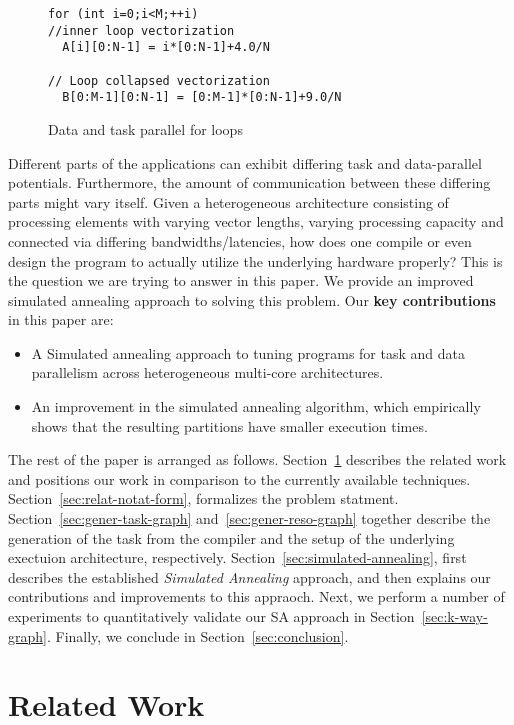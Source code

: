 \documentclass[10pt, conference, compsocconf]{IEEEtran}
\begin{document}
\begin{figure}[h!]
  \centering
  \small{
\begin{verbatim}
for (int i=0;i<M;++i)
//inner loop vectorization
  A[i][0:N-1] = i*[0:N-1]+4.0/N

// Loop collapsed vectorization
  B[0:M-1][0:N-1] = [0:M-1]*[0:N-1]+9.0/N
\end{verbatim}
  }
  \caption{Data and task parallel for loops}
  \label{fig:3}
\end{figure}

Different parts of the applications can exhibit differing task and
data-parallel potentials. Furthermore, the amount of communication
between these differing parts might vary itself. Given a heterogeneous
architecture consisting of processing elements with varying vector
lengths, varying processing capacity and connected via differing
bandwidths/latencies, how does one compile or even design the program to
actually utilize the underlying hardware properly? This is the question
we are trying to answer in this paper. We provide an improved simulated
annealing approach to solving this problem. Our \textbf{key
  contributions} in this paper are:

\begin{itemize}
\item A Simulated annealing approach to tuning programs for task and
  data parallelism across heterogeneous multi-core architectures.
\item An improvement in the simulated annealing algorithm, which
  empirically shows that the resulting partitions have smaller execution
  times.
\end{itemize}

The rest of the paper is arranged as
follows. Section~\ref{sec:related-work} describes the related work and
positions our work in comparison to the currently available
techniques. Section~\ref{sec:relat-notat-form}, formalizes the problem
statment. Section~\ref{sec:gener-task-graph}
and~\ref{sec:gener-reso-graph} together describe the generation of the
task from the compiler and the setup of the underlying exectuion
architecture, respectively. Section~\ref{sec:simulated-annealing}, first
describes the established \textit{Simulated Annealing} approach, and
then explains our contributions and improvements to this appraoch. Next,
we perform a number of experiments to quantitatively validate our SA
approach in Section~\ref{sec:k-way-graph}. Finally, we conclude in
Section~\ref{sec:conclusion}.

\section{Related Work}
\label{sec:related-work}
\end{document}
